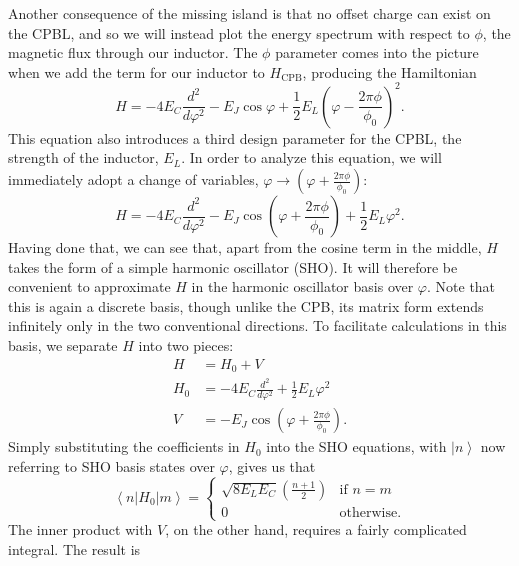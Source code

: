 \documentclass[twocolumn]{revtex4}
\newcommand{\ket}[1]{\left| #1 \right>}
\newcommand{\innerp}[3]{\textstyle\left< #1 \left| #2 \right| #3 \right>}
\begin{document}
Another consequence of the missing island is that no offset charge can
exist on the CPBL, and so we will instead plot the energy spectrum
with respect to $\phi$, the magnetic flux through our inductor. The
$\phi$ parameter comes into the picture when we add the term for our
inductor to $H_{\text{CPB}}$, producing the Hamiltonian
\begin{equation}
  H = -4E_C\frac{d^2}{d\varphi^2}-E_J\cos{\varphi}+\frac{1}{2}
  E_L\left(\varphi-\frac{2\pi\phi}{\phi_0} \right)^2.
\end{equation}
This equation also introduces a third design parameter for the CPBL,
the strength of the inductor, $E_L$. In order to analyze this
equation, we will immediately adopt a change of variables, $\varphi
\rightarrow (\varphi + \frac{2\pi\phi}{\phi_0})$:
\begin{equation}
  \label{H}
  H = -4E_C\frac{d^2}{d\varphi^2}-E_J\cos\left(\varphi+
    \frac{2\pi\phi}{\phi_0}\right)+
  \frac{1}{2} E_L\varphi^2.
\end{equation}
Having done that, we can see that, apart from the cosine term in the
middle, $H$ takes the form of a simple harmonic oscillator (SHO). It will
therefore be convenient to approximate $H$ in the harmonic oscillator
basis over $\varphi$. Note that this is again a discrete basis, though
unlike the CPB, its matrix form extends infinitely only in the two
conventional directions. To facilitate calculations in this basis, we
separate $H$ into two pieces:
\begin{align}
  H & = H_0 + V\\
  H_0 & = -4E_C\frac{d^2}{d\varphi^2} +
  \frac{1}{2} E_L\varphi^2 \\
  V & = -E_J\cos\left(\varphi + \frac{2\pi\phi}{\phi_0}\right).
\end{align}
Simply substituting the coefficients in $H_0$ into the SHO equations,
with $\ket{n}$ now referring to SHO basis states over $\varphi$, gives
us that
\begin{equation}
  \innerp{n}{H_0}{m} = 
  \begin{cases}
    \sqrt{8E_LE_C}\left(\frac{n+1}{2}\right) & \text{if $n=m$} \\
    0 & \text{otherwise.}
  \end{cases}
  \label{inner-H0}
\end{equation}
The inner product with $V$, on the other hand, requires a fairly
complicated integral. The result is
\end{document}
